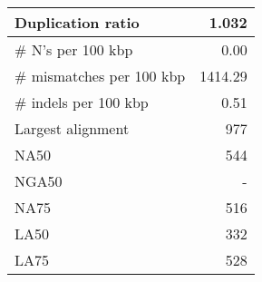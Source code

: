 \documentclass[12pt,a4paper]{article}
\begin{document}
\begin{table}[ht]
\begin{center}
\begin{tabular}{|l*{1}{|r}|}
Duplication ratio & 1.032 \\ \hline
\# N's per 100 kbp & 0.00 \\ \hline
\# mismatches per 100 kbp & 1414.29 \\ \hline
\# indels per 100 kbp & 0.51 \\ \hline
Largest alignment & 977 \\ \hline
NA50 & 544 \\ \hline
NGA50 & - \\ \hline
NA75 & 516 \\ \hline
LA50 & 332 \\ \hline
LA75 & 528 \\ \hline
\end{tabular}
\end{center}
\end{table}
\end{document}
